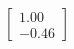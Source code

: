 \documentclass[preview]{standalone}
\begin{document}
\begin{align*}
\begin{bmatrix} 1.00 \\ -0.46 \end{bmatrix}
\end{align*}
\end{document}
